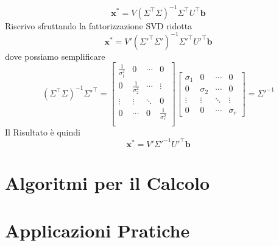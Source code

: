 \documentclass[11pt]{article}
\begin{document}
\[
\mathbf{x}^* = V (\Sigma^\top \Sigma)^{-1} \Sigma^\top U^\top \mathbf{b}
\]
Riscrivo sfruttando la fattorizzazione SVD ridotta
\[
\mathbf{x}^* = V' (\Sigma'^\top \Sigma')^{-1} \Sigma'^\top U'^\top \mathbf{b}
\]
dove possiamo semplificare
\[
(\Sigma^\top \Sigma)^{-1} \Sigma'^\top=
\begin{bmatrix}
\frac{1}{\sigma_1^2} & 0 & \cdots & 0 \\
0 & \frac{1}{\sigma_2^2} & \cdots & \vdots \\
\vdots & \vdots & \ddots & 0  \\
0 & \cdots & 0 & \frac{1}{\sigma_r^2}  \\
\end{bmatrix}\begin{bmatrix}
    \sigma_1 & 0 & \cdots & 0 \\
    0 & \sigma_2 & \cdots & 0 \\
    \vdots & \vdots & \ddots & \vdots \\
    0 & 0 & \cdots & \sigma_r
\end{bmatrix}=\Sigma'^{-1}
\]
Il Risultato è quindi
\[
\mathbf{x}^* = V' \Sigma'^{-1} U'^\top \mathbf{b}
\]

\section{Algoritmi per il Calcolo}
\newpage
\section{Applicazioni Pratiche}
\end{document}
